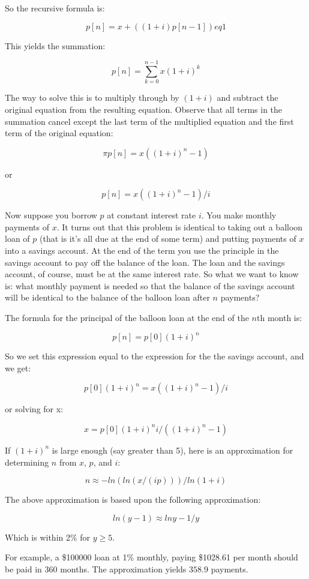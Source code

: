 \noindent So the recursive formula is:

\[p[n] = x + ( (1 + i) p[n-1] ) eq 1\]

This yields the summation:

\[ p[n]=\sum_{k=0}^{n-1}x (1 + i)^k \]

The way to solve this is to multiply through by $(1 + i)$ and subtract
the original equation from the resulting equation.  Observe that all
terms in the summation cancel except the last term of the multiplied
equation and the first term of the original equation:


\[\pi p[n] = x ( (1 + i)^n - 1) \]

or

\[p[n] = x ( (1 + i)^n - 1) / i \]

Now suppose you borrow $p$ at constant interest rate $i$.  You make
monthly payments of $x$.  It turns out that this problem is identical to
taking out a balloon loan of $p$ (that is it's all due at the end of
some term) and putting payments of $x$ into a savings account.  At the
end of the term you use the principle in the savings account to pay off
the balance of the loan.  The loan and the savings account, of course,
must be at the same interest rate.  So what we want to know is: what
monthly payment is needed so that the balance of the savings account
will be identical to the balance of the balloon loan after $n$ payments?

The formula for the principal of the balloon loan at the end of the
$n$th month is:

\[p[n] = p[0] (1 + i)^n \]

So we set this expression equal to the expression for the the savings
account, and we get:

\[ p[0] (1 + i)^n = x ( (1 + i)^n - 1) / i \]

or solving for x:

\[ x = p[0] (1 + i)^n i / ( (1 + i)^n - 1) \]

If $(1 + i)^n$ is large enough (say greater than 5), here is an
approximation for determining $n$ from $x$, $p$, and $i$:

\[n \approx -ln( ln(x/(ip) ) ) / ln(1+i) \]

The above approximation is based upon the following approximation:

\[ ln(y - 1) \approx ln y - 1/y\]

Which is within 2\% for $y \geq 5$.

For example, a \$100000 loan at 1\% monthly, paying \$1028.61 per month
should be paid in $360$ months.  The approximation yields $358.9$
payments.

